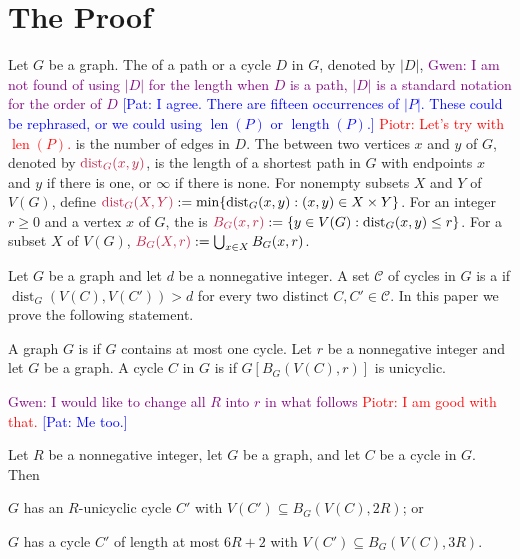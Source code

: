 \documentclass{patmorin}
\newcommand{\pat}[1]{\textcolor{Blue}{[Pat: #1]}}
\newcommand{\gwen}[1]{\textcolor{Purple}{Gwen: #1}}
\newcommand{\piotr}[1]{\textcolor{red}{Piotr: #1}}
\DeclareMathOperator{\dist}{dist}
\begin{document}
\section{The Proof}
\label{proof}

Let $G$ be a graph. 
The  of a path or a cycle $D$ in $G$, denoted by $|D|$, 
\gwen{I am not found of using $|D|$ for the length when $D$ is a path, $|D|$ is a standard notation for the order of $D$} \pat{I agree. There are fifteen occurrences of $|P|$. These could be rephrased, or we could using $\operatorname{len}(P)$ or $\operatorname{length}(P)$.}
\piotr{Let's try with $\operatorname{len}(P)$.}
is the number of edges in $D$. 
The  between two vertices $x$ and $y$ of $G$, 
denoted by $\mathdefin{\dist_G(x,y)}$, 
is the length of a shortest path in $G$ with endpoints $x$ and $y$ if there is one, or $\infty$ if there is none.  
For nonempty subsets $X$ and $Y$ of $V(G)$, 
define $\mathdefin{\dist_G(X,Y)}:=\min\{\dist_G(x,y):(x,y)\in X\times Y\}$. 
For an integer $r\ge 0$ and a vertex $x$ of $G$, 
the  is $\mathdefin{B_G(x,r)}:=\{y\in V(G):\dist_G(x,y)\le r\}$.  For a subset $X$ of $V(G)$, $\mathdefin{B_G(X,r)}:=\bigcup_{x\in X}B_G(x,r)$.

Let $G$ be a graph and let $d$ be a nonnegative integer.
A set $\mathcal{C}$ of cycles in $G$ is a  if $\dist_G(V(C),V(C'))> d$ for every two distinct $C,C'\in\mathcal{C}$.
In this paper we prove the following statement.


A graph $G$ is  if $G$ contains at most one cycle.  Let $r$ be a nonnegative integer and let $G$ be a graph.
A cycle $C$ in $G$ is 
if $G[B_G(V(C),r)]$ is unicyclic.

\gwen{I would like to change all $R$ into $r$ in what follows}
\piotr{I am good with that.} \pat{Me too.}

\begin{lem}\label{short_or_unicycle_nearby}
  Let $R$ be a nonnegative integer, let $G$ be a graph, and let $C$ be a cycle in $G$.
  Then 
  \begin{tightenum}%
    \item $G$ has an $R$-unicyclic cycle $C'$ with $V(C')\subseteq B_G(V(C),2R)$; or\label{short_or_unicycle_nearby:unicyclic}     
    \item $G$ has a cycle $C'$ of length at most $6R+2$ with $V(C')\subseteq B_G(V(C),3R)$.\label{short_or_unicycle_nearby:short}     
  \end{tightenum}
\end{lem}
\end{document}
